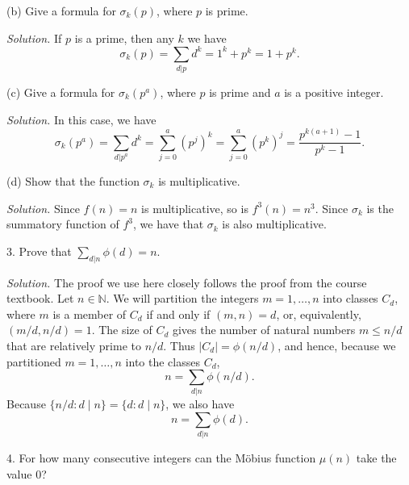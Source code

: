 \documentclass{article}
\newcommand{\N}{\mathbb{N}}
\begin{document}
\vspace{5mm}

(b) Give a formula for $\sigma_k(p)$, where $p$ is prime.

\textit{Solution.}
If $p$ is a prime, then any $k$ we have
%
\begin{equation*}
    \sigma_k(p)
        = \sum_{d|p} d^k
        = 1^k + p^k
        = 1 + p^k
    .
\end{equation*}

\vspace{5mm}

(c) Give a formula for $\sigma_k(p^a)$, where $p$ is prime
and $a$ is a positive integer.

\textit{Solution.}
In this case, we have
%
\begin{equation*}
    \sigma_k(p^a)
        = \sum_{d|p^a} d^k
        = \sum_{j = 0}^a (p^j)^k
        = \sum_{j = 0}^a (p^k)^j
        = \frac{p^{k(a + 1)} - 1}{p^k - 1}
    .
\end{equation*}

\vspace{5mm}

(d) Show that the function $\sigma_k$ is multiplicative.

\textit{Solution.}
Since $f(n) = n$ is multiplicative, so is $f^3(n) = n^3$. Since
$\sigma_k$ is the summatory function of $f^3$, we have that $\sigma_k$
is also multiplicative.

\newpage

3. Prove that $\sum_{d|n} \phi(d) = n$.

\textit{Solution.}
The proof we use here closely follows the proof from the course textbook.
Let $n \in \N$. We will partition the integers $m = 1, \ldots, n$ into
classes $C_d$, where $m$ is a member of $C_d$ if and only if
$(m, n) = d$, or, equivalently, $(m / d, n / d) = 1$. The size of $C_d$
gives the number of natural numbers $m \leq n / d$ that are relatively
prime to $n / d$. Thus $|C_d| = \phi(n / d)$, and hence, because we
partitioned $m = 1, \ldots, n$ into the classes $C_d$,
%
\begin{equation*}
    n = \sum_{d | n} \phi(n / d)
    .
\end{equation*}
%
Because $\{n / d: d \mid n\} = \{d: d \mid n\}$, we also have
%
\begin{equation*}
    n = \sum_{d | n} \phi(d)
    .
\end{equation*}

\newpage

4. For how many consecutive integers can the Möbius function $\mu(n)$
take the value $0$?
\end{document}
